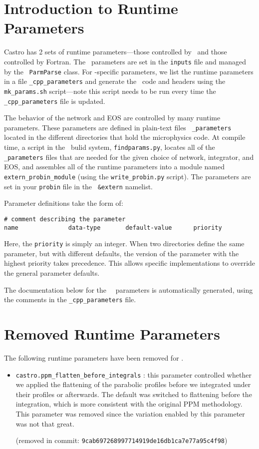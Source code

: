 \label{chapter:parameters}

\section{Introduction to Runtime Parameters}

Castro has 2 sets of runtime parameters---those controlled by
\cpp\ and those controlled by Fortran.  The \cpp\ parameters are set
in the {\tt inputs} file and managed by the \boxlib\ {\tt ParmParse}
class.  For \castro-specific parameters, we list the runtime
parameters in a file {\tt \_cpp\_parameters} and generate the
\cpp\ code and headers using the {\tt mk\_params.sh} script---note
this script needs to be run every time the {\tt \_cpp\_parameters}
file is updated.

The behavior of the network and EOS are controlled by many runtime
parameters.  These parameters are defined in plain-text files {\tt
  \_parameters} located in the different directories that hold the
microphysics code.  At compile time, a script in the \boxlib\ bulid
system, {\tt findparams.py}, locates all of the {\tt \_parameters}
files that are needed for the given choice of network, integrator, and
EOS, and assembles all of the runtime parameters into a module named
{\tt extern\_probin\_module} (using the {\tt write\_probin.py}
script).  The parameters are set in your {\tt probin} file in the {\tt
  \&extern} namelist.

Parameter definitions take the form of:
\begin{verbatim}
# comment describing the parameter
name              data-type       default-value      priority
\end{verbatim}
Here, the {\tt priority} is simply an integer.  When two directories
define the same parameter, but with different defaults, the version of
the parameter with the highest priority takes precedence.  This allows
specific implementations to override the general parameter defaults.

The documentation below for the \castro\ \cpp\ parameters is
automatically generated, using the comments in the {\tt \_cpp\_parameters}
file.



\section{Removed Runtime Parameters}

The following runtime parameters have been removed for \castro.
\begin{itemize}
\item {\tt castro.ppm\_flatten\_before\_integrals} : this parameter
  controlled whether we applied the flattening of the parabolic
  profiles before we integrated under their profiles or afterwards.
  The default was switched to flattening before the integration,
  which is more consistent with the original PPM methodology.  This
  parameter was removed since the variation enabled by this parameter
  was not that great. 

  (removed in commit: {\tt 9cab697268997714919de16db1ca7e77a95c4f98})
\end{itemize}

